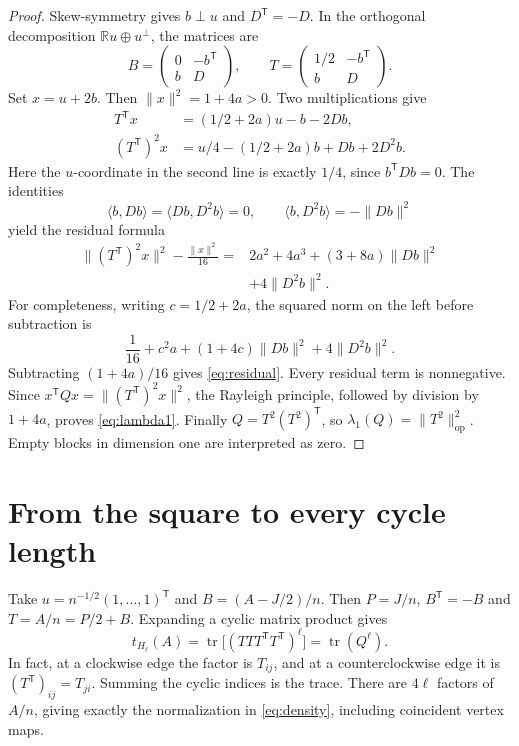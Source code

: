 \documentclass[acmsmall,screen,nonacm,11pt]{acmart}
\newcommand{\R}{\mathbb R}
\newcommand{\op}{\mathrm{op}}
\newcommand{\tr}{\operatorname{tr}}
\newcommand{\norm}[1]{\lVert #1\rVert}
\begin{document}
\begin{proof}
Skew-symmetry gives $b\perp u$ and $D^{\mathsf T}=-D$. In the orthogonal decomposition $\R u\oplus u^\perp$, the matrices are
\[
 B=\begin{pmatrix}0&-b^{\mathsf T}\\ b&D\end{pmatrix},
 \qquad
 T=\begin{pmatrix}1/2&-b^{\mathsf T}\\ b&D\end{pmatrix}.
\]
Set $x=u+2b$. Then $\norm{x}^2=1+4a>0$. Two multiplications give
\begin{align*}
 T^{\mathsf T}x&=(1/2+2a)u-b-2Db,\\
 (T^{\mathsf T})^2x&=u/4-(1/2+2a)b+Db+2D^2b.
\end{align*}
Here the $u$-coordinate in the second line is exactly $1/4$, since $b^{\mathsf T}Db=0$. The identities
\[
 \langle b,Db\rangle=\langle Db,D^2b\rangle=0,
 \qquad \langle b,D^2b\rangle=-\norm{Db}^2
\]
yield the residual formula
\begin{equation}\label{eq:residual}
\begin{split}
 \norm{(T^{\mathsf T})^2x}^2-\frac{\norm{x}^2}{16}
  ={}&2a^2+4a^3+(3+8a)\norm{Db}^2\\
     &+4\norm{D^2b}^2.
\end{split}
\end{equation}
For completeness, writing $c=1/2+2a$, the squared norm on the left before subtraction is
\[
 \frac1{16}+c^2a+(1+4c)\norm{Db}^2+4\norm{D^2b}^2.
\]
Subtracting $(1+4a)/16$ gives \eqref{eq:residual}. Every residual term is nonnegative. Since $x^{\mathsf T}Qx=\norm{(T^{\mathsf T})^2x}^2$, the Rayleigh principle, followed by division by $1+4a$, proves \eqref{eq:lambda1}. Finally $Q=T^2(T^2)^{\mathsf T}$, so $\lambda_1(Q)=\norm{T^2}_{\op}^2$. Empty blocks in dimension one are interpreted as zero.
\end{proof}

\section{From the square to every cycle length}

Take $u=n^{-1/2}(1,\ldots,1)^{\mathsf T}$ and $B=(A-J/2)/n$. Then $P=J/n$, $B^{\mathsf T}=-B$ and $T=A/n=P/2+B$. Expanding a cyclic matrix product gives
\begin{equation}\label{eq:trace}
 t_{H_\ell}(A)=\tr\bigl[(TTT^{\mathsf T}T^{\mathsf T})^\ell\bigr]
              =\tr(Q^\ell).
\end{equation}
In fact, at a clockwise edge the factor is $T_{ij}$, and at a counterclockwise edge it is $(T^{\mathsf T})_{ij}=T_{ji}$. Summing the cyclic indices is the trace. There are $4\ell$ factors of $A/n$, giving exactly the normalization in \eqref{eq:density}, including coincident vertex maps.
\end{document}
